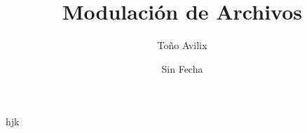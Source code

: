 \documentclass{book}
\title{Modulación de Archivos}
\author{Toño Avilix}
\date{Sin Fecha}
\begin{document}
\maketitle
\tableofcontents

hjk
\end{document}

